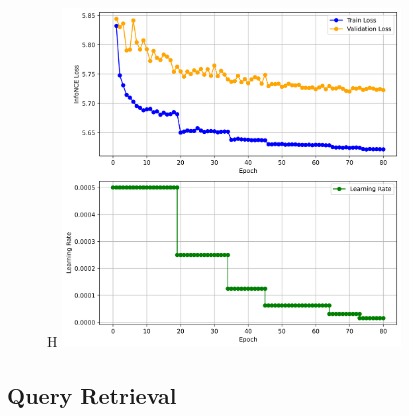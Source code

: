 \documentclass[a4paper,12pt]{article}
\begin{document}
\begin{figure}{H}
    \centering
    \includegraphics[width=0.8\textwidth]{../figures/training_plot.png}
    \caption{}
    \label{fig:loss}
\end{figure}


\subsection{Query Retrieval}
\end{document}
